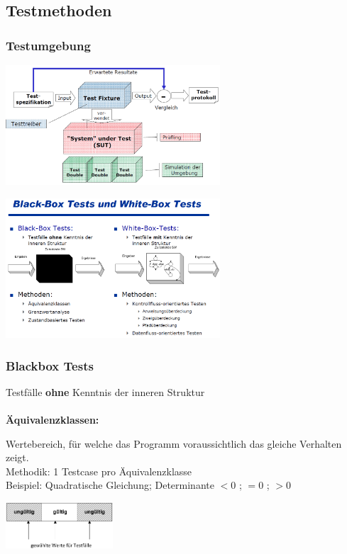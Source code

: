 \subsection{Testmethoden}
\subsubsection{Testumgebung}
\begin{minipage}{0.5\linewidth}
\includegraphics[width=8cm]{images/testumgebung}
\end{minipage}
\begin{minipage}{0.5\linewidth}
	\includegraphics[width=8cm]{images/blackwhitetests}
\end{minipage}
\subsubsection{Blackbox Tests}
Testfälle \textbf{ohne} Kenntnis der inneren Struktur\\\\
\textbf{Äquivalenzklassen:} \\
\begin{minipage}{12cm}
Wertebereich, für welche das Programm voraussichtlich das gleiche Verhalten zeigt. \\
Methodik: 1 Testcase pro Äquivalenzklasse \\
Beispiel: Quadratische Gleichung; Determinante $<0$ ; $=0$ ; $>0$ \\
\vspace{2cm}
\end{minipage}
\begin{minipage}{4cm}
	\includegraphics[width=4cm]{images/aequivalenzklasse.png}
\end{minipage}

